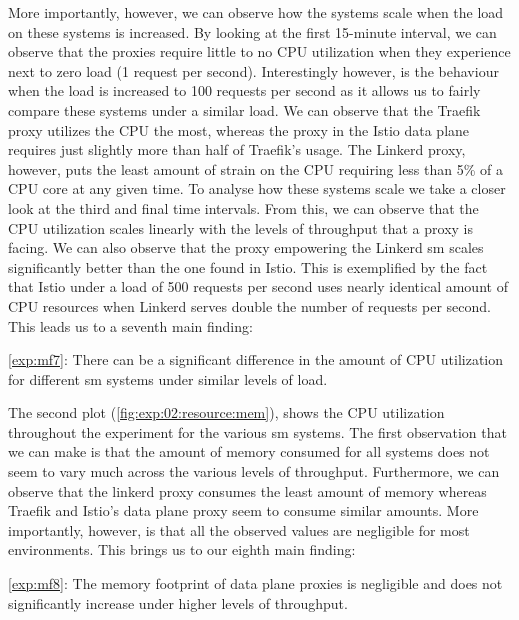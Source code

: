 More importantly, however, we can observe how the systems scale when the load on these systems is increased. By looking at the first 15-minute interval, we can observe that the proxies require little to no CPU utilization when they experience next to zero load (1 request per second). Interestingly however, is the behaviour when the load is increased to 100 requests per second as it allows us to fairly compare these systems under a similar load. We can observe that the Traefik proxy utilizes the CPU the most, whereas the proxy in the Istio data plane requires just slightly more than half of Traefik's usage. The Linkerd proxy, however, puts the least amount of strain on the CPU requiring less than 5\% of a CPU core at any given time. To analyse how these systems scale we take a closer look at the third and final time intervals. From this, we can observe that the CPU utilization scales linearly with the levels of throughput that a proxy is facing. We can also observe that the proxy empowering the Linkerd \gls{sm} scales significantly better than the one found in Istio. This is exemplified by the fact that Istio under a load of 500 requests per second uses nearly identical amount of CPU resources when Linkerd serves double the number of requests per second. This leads us to a seventh main finding:

\begin{shaded*}
    \noindent
    \ref{exp:mf7}: 
    There can be a significant difference in the amount of CPU utilization for different \gls{sm} systems under similar levels of load.
\end{shaded*}

The second plot (\cref{fig:exp:02:resource:mem}), shows the CPU utilization throughout the experiment for the various \gls{sm} systems. The first observation that we can make is that the amount of memory consumed for all systems does not seem to vary much across the various levels of throughput. Furthermore, we can observe that the linkerd proxy consumes the least amount of memory whereas Traefik and Istio's data plane proxy seem to consume similar amounts. More importantly, however, is that all the observed values are negligible for most environments. This brings us to our eighth main finding:

\begin{shaded*}
    \noindent
    \ref{exp:mf8}: 
    The memory footprint of data plane proxies is negligible and does not significantly increase under higher levels of throughput.
\end{shaded*}

